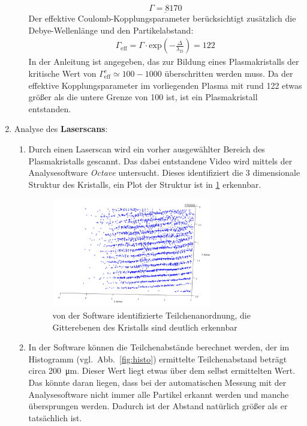 \documentclass[12pt,a4paper,ngerman]{article}
\begin{document}
\begin{enumerate}[font=\bfseries]
\begin{enumerate}[font=\bfseries, label=\alph*)]
    	\begin{equation}
    		\underline{\Gamma = 8170}
    	\end{equation}
    	Der effektive Coulomb-Kopplungsparameter berücksichtigt zusätzlich die Debye-Wellenlänge
    	und den Partikelabstand:
    	\begin{eqnarray}
    		\Gamma_{\text{eff}} = \Gamma \cdot \text{exp}\left(-\frac{\Delta}{\lambda_D}\right) = 122
    	\end{eqnarray}
  		In der Anleitung \cite{Anleitung} ist angegeben, das zur Bildung eines Plasmakristalls der kritische Wert von $\Gamma_{\text{eff}}^c \simeq 100-1000$ überschritten werden muss. Da der effektive Kopplungsparameter im vorliegenden Plasma mit rund 122 etwas größer als die untere Grenze von 100 ist, ist ein Plasmakristall entstanden.
		\end{enumerate}
		\item Analyse des \textbf{Laserscans}:\\
		\begin{enumerate}[font=\bfseries, label=\alph*)]
		\item	Durch einen Laserscan wird ein vorher ausgewählter Bereich des Plasmakristalls gescannt. Das dabei entstandene Video wird mittels der Analysesoftware \textit{Octave} untersucht. Dieses identifiziert die 3 dimensionale Struktur des Kristalls, ein Plot der Struktur ist in \ref{fig:GitterAnalyse} erkennbar.
			\begin{figure}[ht]
				\centering
				\includegraphics[width=0.7\textwidth]{data/gitteranalyze3D.png}
				\caption{von der Software identifizierte Teilchenanordnung, die Gitterebenen des Kristalls sind deutlich erkennbar}
				\label{fig:GitterAnalyse}
			\end{figure}
		\item	In der Software können die Teilchenabstände berechnet werden, der im Histogramm (vgl.~Abb.~\ref{fig:histo}) ermittelte Teilchenabstand beträgt circa \qty{200}{\micro\meter}. Dieser Wert liegt etwas über dem selbst ermittelten Wert. Das könnte daran liegen, dass bei der automatischen Messung mit der Analysesoftware nicht immer alle Partikel erkannt werden und manche übersprungen werden. Dadurch ist der Abstand natürlich größer als er tatsächlich ist.

\end{enumerate}
\end{enumerate}
\end{document}

